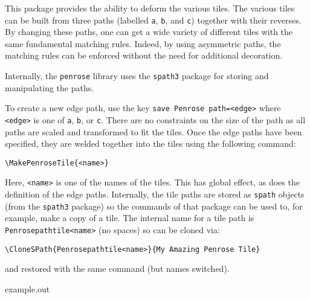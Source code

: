 \documentclass{ltxdoc}
\newenvironment{example}
  {\VerbatimEnvironment
   \begin{VerbatimOut}{example.out}}
  {\end{VerbatimOut}
   \begin{center}
   \setlength{\parindent}{0pt}
   \fbox{\begin{minipage}{.9\linewidth}
     \lstset{breakatwhitespace=true,breaklines=true,language=TeX,basicstyle=\small}
     
   \end{minipage}}

   \fbox{\begin{minipage}{.9\linewidth}
     \centering
     
   \end{minipage}}
\end{center}
}
\begin{document}
This package provides the ability to deform the various tiles.
The various tiles can be built from three paths (labelled \Verb+a+, \Verb+b+, and \Verb+c+) together with their reverses.
By changing these paths, one can get a wide variety of different tiles with the same fundamental matching rules.
Indeed, by using asymmetric paths, the matching rules can be enforced without the need for additional decoration.

Internally, the \Verb+penrose+ library uses the \Verb+spath3+ package for storing and manipulating the paths.

To create a new edge path, use the key \Verb+save Penrose path=<edge>+ where \Verb+<edge>+ is one of \Verb+a+, \Verb+b+, or \Verb+c+.
There are no constraints on the size of the path as all paths are scaled and transformed to fit the tiles.
Once the edge paths have been specified, they are welded together into the tiles using the following command:
%
\begin{verbatim}
\MakePenroseTile{<name>}
\end{verbatim}
%
Here, \Verb+<name>+ is one of the names of the tiles.
This has global effect, as does the definition of the edge paths.
Internally, the tile paths are stored as \Verb+spath+ objects (from the \Verb+spath3+ package) so the commands of that package can be used to, for example, make a copy of a tile.
The internal name for a tile path is \Verb+Penrosepathtile<name>+ (no spaces) so can be cloned via:
%
\begin{verbatim}
\CloneSPath{Penrosepathtile<name>}{My Amazing Penrose Tile}
\end{verbatim}
%
and restored with the same command (but names switched).

\begin{example}
\end{example}
\end{document}
